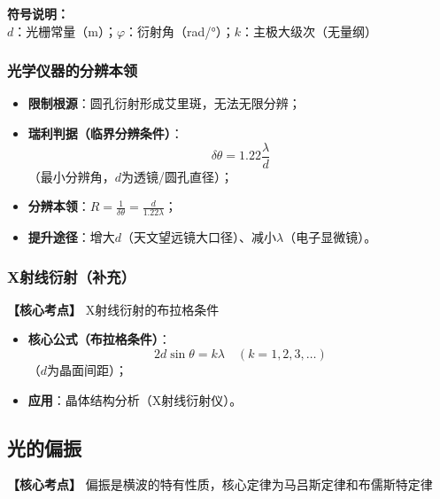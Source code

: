\textbf{符号说明：} \\
$d$：光栅常量（m）；\quad $\varphi$：衍射角（rad/°）；\quad $k$：主极大级次（无量纲）
\vspace{0.5em}

\subsubsection{光学仪器的分辨本领}
\begin{itemize}
    \item \textbf{限制根源}：圆孔衍射形成艾里斑，无法无限分辨；
    \item \textbf{瑞利判据（临界分辨条件）}：
          \[
          \delta\theta = 1.22 \frac{\lambda}{d}
          \]（最小分辨角，$d$为透镜/圆孔直径）；
    \item \textbf{分辨本领}：$R = \frac{1}{\delta\theta} = \frac{d}{1.22\lambda}$；
    \item \textbf{提升途径}：增大$d$（天文望远镜大口径）、减小$\lambda$（电子显微镜）。
\end{itemize}
\vspace{0.5em}

\subsubsection{X射线衍射（补充）}
\textbf{【核心考点】} X射线衍射的布拉格条件 \par\vspace{0.3em}
\begin{itemize}
    \item \textbf{核心公式（布拉格条件）}：
          \[
          2d\sin\theta = k\lambda \quad (k=1,2,3,\dots)
          \]（$d$为晶面间距）；
    \item \textbf{应用}：晶体结构分析（X射线衍射仪）。
\end{itemize}
\vspace{0.5em}

\subsection{光的偏振}
\textbf{【核心考点】} 偏振是横波的特有性质，核心定律为马吕斯定律和布儒斯特定律 \par\vspace{0.3em}

